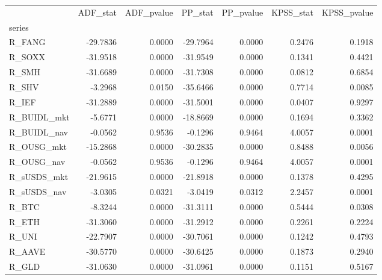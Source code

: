 \begin{tabular}{lrrrrrr}
\toprule
 & ADF\_stat & ADF\_pvalue & PP\_stat & PP\_pvalue & KPSS\_stat & KPSS\_pvalue \\
series &  &  &  &  &  &  \\
\midrule
R\_FANG & -29.7836 & 0.0000 & -29.7964 & 0.0000 & 0.2476 & 0.1918 \\
R\_SOXX & -31.9518 & 0.0000 & -31.9549 & 0.0000 & 0.1341 & 0.4421 \\
R\_SMH & -31.6689 & 0.0000 & -31.7308 & 0.0000 & 0.0812 & 0.6854 \\
R\_SHV & -3.2968 & 0.0150 & -35.6466 & 0.0000 & 0.7714 & 0.0085 \\
R\_IEF & -31.2889 & 0.0000 & -31.5001 & 0.0000 & 0.0407 & 0.9297 \\
R\_BUIDL\_mkt & -5.6771 & 0.0000 & -18.8669 & 0.0000 & 0.1694 & 0.3362 \\
R\_BUIDL\_nav & -0.0562 & 0.9536 & -0.1296 & 0.9464 & 4.0057 & 0.0001 \\
R\_OUSG\_mkt & -15.2868 & 0.0000 & -30.2835 & 0.0000 & 0.8488 & 0.0056 \\
R\_OUSG\_nav & -0.0562 & 0.9536 & -0.1296 & 0.9464 & 4.0057 & 0.0001 \\
R\_sUSDS\_mkt & -21.9615 & 0.0000 & -21.8918 & 0.0000 & 0.1378 & 0.4295 \\
R\_sUSDS\_nav & -3.0305 & 0.0321 & -3.0419 & 0.0312 & 2.2457 & 0.0001 \\
R\_BTC & -8.3244 & 0.0000 & -31.3111 & 0.0000 & 0.5444 & 0.0308 \\
R\_ETH & -31.3060 & 0.0000 & -31.2912 & 0.0000 & 0.2261 & 0.2224 \\
R\_UNI & -22.7907 & 0.0000 & -30.7061 & 0.0000 & 0.1242 & 0.4793 \\
R\_AAVE & -30.5770 & 0.0000 & -30.6425 & 0.0000 & 0.1873 & 0.2940 \\
R\_GLD & -31.0630 & 0.0000 & -31.0961 & 0.0000 & 0.1151 & 0.5167 \\
\bottomrule
\end{tabular}
